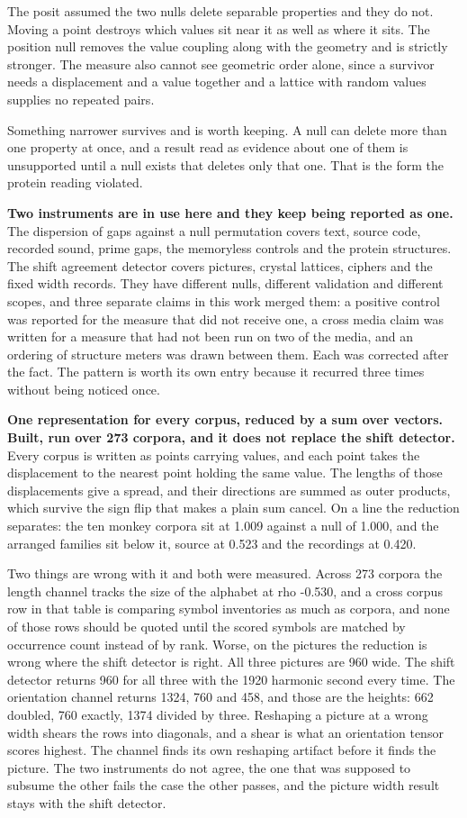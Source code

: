 The posit assumed the two nulls delete separable properties and they do not. Moving a point destroys which values sit near it as well as where it sits. The position null removes the value coupling along with the geometry and is strictly stronger. The measure also cannot see geometric order alone, since a survivor needs a displacement and a value together and a lattice with random values supplies no repeated pairs.

Something narrower survives and is worth keeping. A null can delete more than one property at once, and a result read as evidence about one of them is unsupported until a null exists that deletes only that one. That is the form the protein reading violated.

\textbf{Two instruments are in use here and they keep being reported as one.} The dispersion of gaps against a null permutation covers text, source code, recorded sound, prime gaps, the memoryless controls and the protein structures. The shift agreement detector covers pictures, crystal lattices, ciphers and the fixed width records. They have different nulls, different validation and different scopes, and three separate claims in this work merged them: a positive control was reported for the measure that did not receive one, a cross media claim was written for a measure that had not been run on two of the media, and an ordering of structure meters was drawn between them. Each was corrected after the fact. The pattern is worth its own entry because it recurred three times without being noticed once.

\textbf{One representation for every corpus, reduced by a sum over vectors. Built, run over 273 corpora, and it does not replace the shift detector.} Every corpus is written as points carrying values, and each point takes the displacement to the nearest point holding the same value. The lengths of those displacements give a spread, and their directions are summed as outer products, which survive the sign flip that makes a plain sum cancel. On a line the reduction separates: the ten monkey corpora sit at 1.009 against a null of 1.000, and the arranged families sit below it, source at 0.523 and the recordings at 0.420.

Two things are wrong with it and both were measured. Across 273 corpora the length channel tracks the size of the alphabet at rho -0.530, and a cross corpus row in that table is comparing symbol inventories as much as corpora, and none of those rows should be quoted until the scored symbols are matched by occurrence count instead of by rank. Worse, on the pictures the reduction is wrong where the shift detector is right. All three pictures are 960 wide. The shift detector returns 960 for all three with the 1920 harmonic second every time. The orientation channel returns 1324, 760 and 458, and those are the heights: 662 doubled, 760 exactly, 1374 divided by three. Reshaping a picture at a wrong width shears the rows into diagonals, and a shear is what an orientation tensor scores highest. The channel finds its own reshaping artifact before it finds the picture. The two instruments do not agree, the one that was supposed to subsume the other fails the case the other passes, and the picture width result stays with the shift detector.

